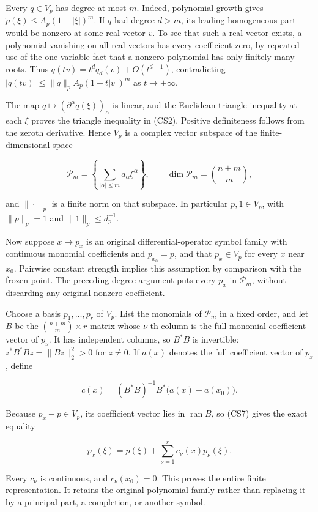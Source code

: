 \documentclass[
  11pt,
]{article}
\begin{document}
Every \(q\in V_p\) has degree at most \(m\). Indeed, polynomial growth
gives \(\widetilde p(\xi)\leq A_p(1+|\xi|)^m\). If \(q\) had degree
\(d>m\), its leading homogeneous part would be nonzero at some real
vector \(v\). To see that such a real vector exists, a polynomial
vanishing on all real vectors has every coefficient zero, by repeated
use of the one-variable fact that a nonzero polynomial has only finitely
many roots. Thus \(q(tv)=t^d q_d(v)+O(t^{d-1})\), contradicting
\(|q(tv)|\leq\|q\|_p A_p(1+t|v|)^m\) as \(t\to+\infty\).

The map \(q\mapsto (\partial^\alpha q(\xi))_\alpha\) is linear, and the
Euclidean triangle inequality at each \(\xi\) proves the triangle
inequality in (CS2). Positive definiteness follows from the zeroth
derivative. Hence \(V_p\) is a complex vector subspace of the
finite-dimensional space

\[
 \mathcal P_m=\left\{\sum_{|\alpha|\leq m}a_\alpha\xi^\alpha\right\},
 \qquad \dim\mathcal P_m=\binom{n+m}{m},                         \tag{CS6}
\]

and \(\|\cdot\|_p\) is a finite norm on that subspace. In particular
\(p,1\in V_p\), with \(\|p\|_p=1\) and \(\|1\|_p\leq d_p^{-1}\).

Now suppose \(x\mapsto p_x\) is an original differential-operator symbol
family with continuous monomial coefficients and \(p_{x_0}=p\), and that
\(p_x\in V_p\) for every \(x\) near \(x_0\). Pairwise constant strength
implies this assumption by comparison with the frozen point. The
preceding degree argument puts every \(p_x\) in \(\mathcal P_m\),
without discarding any original nonzero coefficient.

Choose a basis \(p_1,\ldots,p_r\) of \(V_p\). List the monomials of
\(\mathcal P_m\) in a fixed order, and let \(B\) be the
\(\binom{n+m}{m}\times r\) matrix whose \(\nu\)-th column is the full
monomial coefficient vector of \(p_\nu\). It has independent columns, so
\(B^*B\) is invertible: \(z^*B^*Bz=\|Bz\|_2^2>0\) for \(z\neq0\). If
\(a(x)\) denotes the full coefficient vector of \(p_x\), define

\[
 c(x)=(B^*B)^{-1}B^*\big(a(x)-a(x_0)\big).                     \tag{CS7}
\]

Because \(p_x-p\in V_p\), its coefficient vector lies in
\(\operatorname{ran}B\), so (CS7) gives the exact equality

\[
 p_x(\xi)=p(\xi)+\sum_{\nu=1}^r c_\nu(x)p_\nu(\xi).            \tag{CS8}
\]

Every \(c_\nu\) is continuous, and \(c_\nu(x_0)=0\). This proves the
entire finite representation. It retains the original polynomial family
rather than replacing it by a principal part, a completion, or another
symbol.
\end{document}
